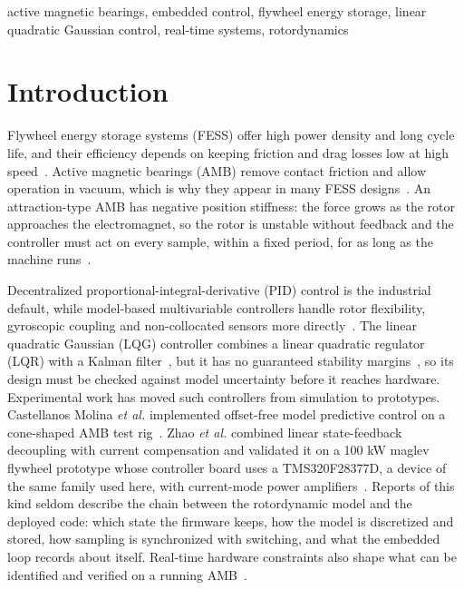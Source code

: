 \documentclass[conference]{IEEEtran}
\begin{document}
\begin{IEEEkeywords}
active magnetic bearings, embedded control, flywheel energy storage, linear quadratic Gaussian control, real-time systems, rotordynamics
\end{IEEEkeywords}

\section{Introduction}\label{sec:intro}

Flywheel energy storage systems (FESS) offer high power density and long cycle life, and their efficiency depends on keeping friction and drag losses low at high speed~\cite{choudhury2021flywheel}. Active magnetic bearings (AMB) remove contact friction and allow operation in vacuum, which is why they appear in many FESS designs~\cite{schweitzer2009magnetic,du2025review}. An attraction-type AMB has negative position stiffness: the force grows as the rotor approaches the electromagnet, so the rotor is unstable without feedback and the controller must act on every sample, within a fixed period, for as long as the machine runs~\cite{schweitzer2009magnetic}.

Decentralized proportional-integral-derivative (PID) control is the industrial default, while model-based multivariable controllers handle rotor flexibility, gyroscopic coupling and non-collocated sensors more directly~\cite{wu2025review,du2025review}. The linear quadratic Gaussian (LQG) controller combines a linear quadratic regulator (LQR) with a Kalman filter~\cite{kalman1960new}, but it has no guaranteed stability margins~\cite{doyle1978guaranteed}, so its design must be checked against model uncertainty before it reaches hardware. Experimental work has moved such controllers from simulation to prototypes. Castellanos Molina \emph{et al.} implemented offset-free model predictive control on a cone-shaped AMB test rig~\cite{castellanos2021offset}. Zhao \emph{et al.} combined linear state-feedback decoupling with current compensation and validated it on a 100 kW maglev flywheel prototype whose controller board uses a TMS320F28377D, a device of the same family used here, with current-mode power amplifiers~\cite{zhao2026constraint}. Reports of this kind seldom describe the chain between the rotordynamic model and the deployed code: which state the firmware keeps, how the model is discretized and stored, how sampling is synchronized with switching, and what the embedded loop records about itself. Real-time hardware constraints also shape what can be identified and verified on a running AMB~\cite{wang2026identification}.
\end{document}
